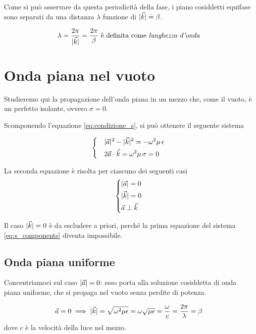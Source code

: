 \begin{itemize}
		Come si può osservare da questa periodicità della fase, i piano cosiddetti equifase sono separati da una distanza $\lambda$ funzione di $|\vec{k}| \stackrel{.}{=} \beta$.

		\begin{equation} \label{eq:lunghezza_donda}
			\lambda = \frac{2 \pi}{|\vec{k}|} = \frac{2 \pi}{\beta} \text{ è definita come \emph{lunghezza d'onda}}
		\end{equation}
	\end{itemize}

\section{Onda piana nel vuoto}
	Studieremo qui la propagazione dell'onda piana in un mezzo che, come il vuoto, è un perfetto isolante, ovvero $\sigma = 0$.

	Scomponendo l'equazione \eqref{eq:condizione_s}, si può ottenere il seguente sistema

	\begin{equation} \label{eq:s_components}
		\begin{dcases}
			& |\vec{a}|^2 - |\vec{k}|^2 = - \omega^2 \mu \, \epsilon \\
			& 2 \vec{a} \cdot \vec{k} = \omega^2 \mu \, \sigma = 0
		\end{dcases}
	\end{equation}

	La seconda equazione è risolta per ciascuno dei seguenti casi
	\begin{equation}\begin{dcases}
		|\vec{a}| = 0 \\
		|\vec{k}| = 0 \\
		\vec{a} \perp \vec{k}
	\end{dcases}\end{equation}

	Il caso $|\vec{k}| = 0$ è da escludere a priori, perché la prima equazione del sistema \eqref{eq:s_components} diventa impossibile.

	\subsection{Onda piana uniforme}
		Concentriamoci sul caso $|\vec{a}| = 0$: esso porta alla soluzione cosiddetta di onda piana uniforme, che si propaga nel vuoto senza perdite di potenza.

		\begin{equation*}
				\vec{a} = 0 \implies |\vec{k}| = \sqrt{\omega^2 \mu \epsilon} = \omega \sqrt{\mu \epsilon} = \frac{\omega}{c} = \frac{2 \pi}{\lambda} = \beta
		\end{equation*}
		dove $c$ è la velocità della luce nel mezzo.

